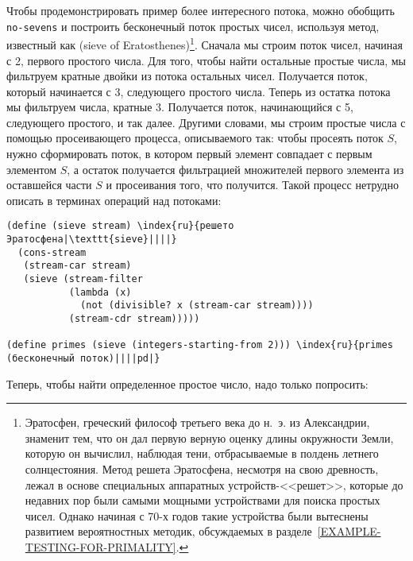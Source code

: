 Чтобы продемонстрировать пример более интересного потока,
можно обобщить {\tt no-sevens} и построить бесконечный поток
простых чисел, используя метод, известный как
 (sieve of Eratosthenes)\footnote{Эратосфен,
греческий философ третьего века до н.~э. из
Александрии, знаменит тем, что он дал первую верную
оценку длины окружности
Земли, которую он вычислил, наблюдая тени, отбрасываемые в полдень
летнего солнцестояния.  Метод решета Эратосфена, несмотря на свою
древность, лежал в основе специальных аппаратных устройств-<<решет>>,
которые до недавних пор были самыми мощными устройствами для
поиска простых чисел. Однако начиная с 70-х годов такие устройства были
вытеснены развитием вероятностных методик, обсуждаемых в
разделе~\ref{EXAMPLE-TESTING-FOR-PRIMALITY}.
}.
Сначала мы строим поток чисел, начиная с 2, первого простого числа.
Для того, чтобы найти остальные простые числа, мы фильтруем кратные
двойки из потока остальных чисел.  Получается поток, который
начинается с 3, следующего простого числа.  Теперь из остатка потока
мы фильтруем числа, кратные 3.  Получается поток, начинающийся с 5,
следующего простого, и так далее.  Другими словами, мы строим простые
числа с помощью просеивающего процесса, описываемого так: чтобы
просеять поток $S$, нужно сформировать поток, в котором
первый элемент совпадает с первым элементом $S$, а остаток
получается фильтрацией множителей первого элемента из оставшейся части
$S$ и просеивания того, что получится.  Такой процесс
нетрудно описать в терминах операций над потоками:

\begin{Verbatim}[fontsize=\small]
(define (sieve stream) \index{ru}{решето Эратосфена|\texttt{sieve}||||}
  (cons-stream
   (stream-car stream)
   (sieve (stream-filter
           (lambda (x)
             (not (divisible? x (stream-car stream))))
           (stream-cdr stream)))))

(define primes (sieve (integers-starting-from 2))) \index{ru}{primes (бесконечный поток)||||pd|}
\end{Verbatim}
Теперь, чтобы найти определенное простое число, надо только попросить:

